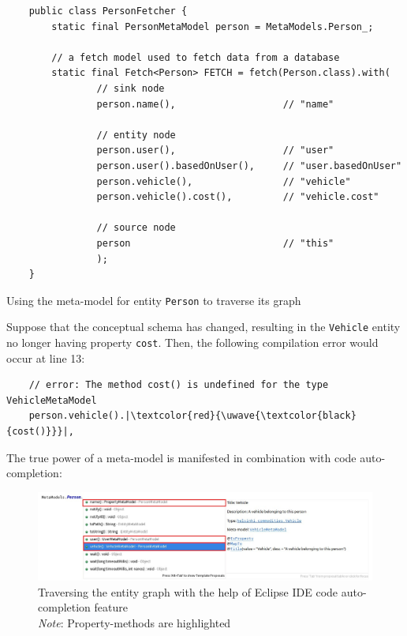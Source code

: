 \begin{listing}[H]
    \begin{verbatim}
    public class PersonFetcher {
        static final PersonMetaModel person = MetaModels.Person_;
            
        // a fetch model used to fetch data from a database
        static final Fetch<Person> FETCH = fetch(Person.class).with(
                // sink node
                person.name(),                   // "name"

                // entity node
                person.user(),                   // "user"
                person.user().basedOnUser(),     // "user.basedOnUser"
                person.vehicle(),                // "vehicle"
                person.vehicle().cost(),         // "vehicle.cost"

                // source node
                person                           // "this"
                );
    }
    \end{verbatim}
    \caption{Using the meta-model for entity \texttt{Person} to traverse its graph}
    \label{lst:person_meta-model_usage}
\end{listing}

Suppose that the conceptual schema has changed, resulting in the \texttt{Vehicle} entity no longer having property \texttt{cost}. Then, the following compilation error would occur at line 13:
\begin{verbatim}
    // error: The method cost() is undefined for the type VehicleMetaModel
    person.vehicle().|\textcolor{red}{\uwave{\textcolor{black}{cost()}}}|,
\end{verbatim}

\n

The true power of a meta-model is manifested in combination with code auto-completion:

\begin{figure}[H]\centering
    \includegraphics[scale=0.5]{images/eclipse-hl.jpg}
    \caption[Traversing the entity graph with the help of Eclipse IDE code auto-completion feature]{Traversing the entity graph with the help of Eclipse IDE code auto-completion feature
    \\
    \textit{Note}: Property-methods are highlighted}\label{fig:eclipse}
\end{figure}


